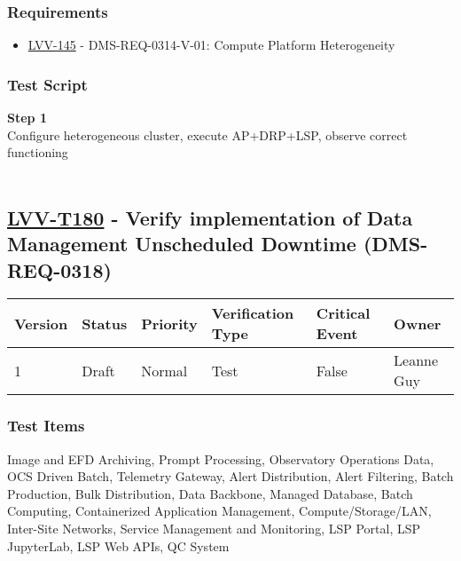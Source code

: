 \hypertarget{requirements-156}{%
\subsubsection{Requirements}\label{requirements-156}}

\begin{itemize}
\tightlist
\item
  \href{https://jira.lsstcorp.org/browse/LVV-145}{LVV-145} -
  DMS-REQ-0314-V-01: Compute Platform Heterogeneity
\end{itemize}

\hypertarget{test-script-156}{%
\subsubsection{Test Script}\label{test-script-156}}

\textbf{Step 1}\\
Configure heterogeneous cluster, execute AP+DRP+LSP, observe correct
functioning\\
~\\

\hypertarget{lvv-t180---verify-implementation-of-data-management-unscheduled-downtime-dms-req-0318}{%
\subsection{\texorpdfstring{\href{https://jira.lsstcorp.org/secure/Tests.jspa\#/testCase/LVV-T180}{LVV-T180}
- Verify implementation of Data Management Unscheduled Downtime
(DMS-REQ-0318)}{LVV-T180 - Verify implementation of Data Management Unscheduled Downtime (DMS-REQ-0318)}}\label{lvv-t180---verify-implementation-of-data-management-unscheduled-downtime-dms-req-0318}}

\begin{longtable}[]{@{}llllll@{}}
\toprule
Version & Status & Priority & Verification Type & Critical Event &
Owner\tabularnewline
\midrule
\endhead
1 & Draft & Normal & Test & False & Leanne Guy\tabularnewline
\bottomrule
\end{longtable}

\hypertarget{test-items-156}{%
\subsubsection{Test Items}\label{test-items-156}}

Image and EFD Archiving, Prompt Processing, Observatory Operations Data,
OCS Driven Batch, Telemetry Gateway, Alert Distribution, Alert
Filtering, Batch Production, Bulk Distribution, Data Backbone, Managed
Database, Batch Computing, Containerized Application Management,
Compute/Storage/LAN, Inter-Site Networks, Service Management and
Monitoring, LSP Portal, LSP JupyterLab, LSP Web APIs, QC System


